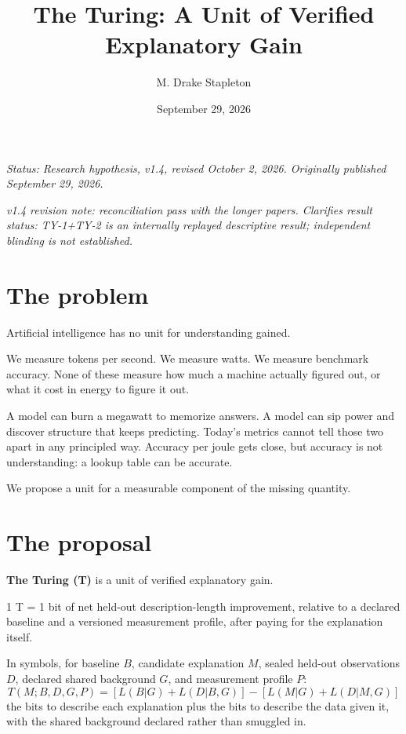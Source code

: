 \documentclass[11pt,letterpaper]{article}
\title{The Turing: A Unit of Verified Explanatory Gain}
\author{M. Drake Stapleton}
\date{September 29, 2026}
\begin{document}
\maketitle

\noindent\textit{Status: Research hypothesis, v1.4, revised October 2, 2026. Originally published September 29, 2026.}

\noindent\textit{v1.4 revision note: reconciliation pass with the longer papers. Clarifies result status: TY-1+TY-2 is an internally replayed descriptive result; independent blinding is not established.}

\section{The problem}

Artificial intelligence has no unit for understanding gained.

We measure tokens per second. We measure watts. We measure benchmark accuracy. None of these measure how much a machine actually figured out, or what it cost in energy to figure it out.

A model can burn a megawatt to memorize answers. A model can sip power and discover structure that keeps predicting. Today's metrics cannot tell those two apart in any principled way. Accuracy per joule gets close, but accuracy is not understanding: a lookup table can be accurate.

We propose a unit for a measurable component of the missing quantity.

\section{The proposal}

\textbf{The Turing (T)} is a unit of verified explanatory gain.

1 T = 1 bit of net held-out description-length improvement, relative to a declared baseline and a versioned measurement profile, after paying for the explanation itself.

In symbols, for baseline $B$, candidate explanation $M$, sealed held-out observations $D$, declared shared background $G$, and measurement profile $P$:
\begin{equation}
T(M;B,D,G,P) = [L(B|G) + L(D|B,G)] - [L(M|G) + L(D|M,G)]
\end{equation}
the bits to describe each explanation plus the bits to describe the data given it, with the shared background declared rather than smuggled in.
\end{document}
